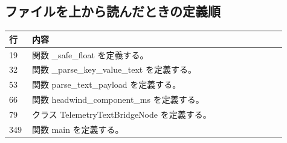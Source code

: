 \documentclass[a4paper,11pt]{article}
\begin{document}
        \subsection*{ファイルを上から読んだときの定義順}
            \begin{longtable}{p{0.07\linewidth} p{0.84\linewidth}}
            \toprule
            行 & 内容 \\
            \midrule
            19 & 関数 \_safe\_float を定義する。 \\
32 & 関数 \_parse\_key\_value\_text を定義する。 \\
53 & 関数 parse\_text\_payload を定義する。 \\
66 & 関数 headwind\_component\_ms を定義する。 \\
79 & クラス TelemetryTextBridgeNode を定義する。 \\
349 & 関数 main を定義する。 \\
            \bottomrule
            \end{longtable}
\end{document}
